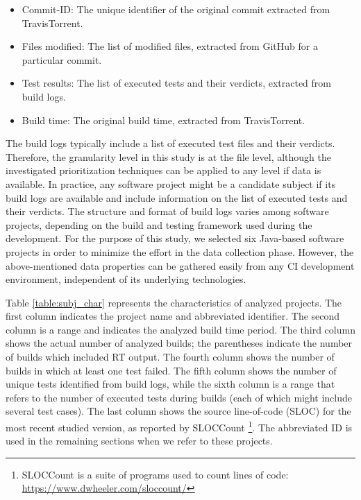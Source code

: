\documentclass[1p]{elsarticle}
\begin{document}
\begin{itemize}
\item Commit-ID: The unique identifier of the original commit extracted from TravisTorrent. 
\item Files modified: The list of modified files, extracted from GitHub for a particular commit. 
\item Test results: The list of executed tests and their verdicts, extracted from build logs. 
\item Build time: The original build time, extracted from TravisTorrent. 
\end{itemize}

The build logs typically include a list of executed test files and their verdicts. Therefore, the granularity level in this study is at the file level, although the investigated prioritization techniques can be applied to any level if data is available. In practice, any software project might be a candidate subject if its build logs are available and include information on the list of executed tests and their verdicts. The structure and format of build logs varies among software projects, depending on the build and testing framework used during the development. For the purpose of this study, we selected six Java-based software projects in order to minimize the effort in the data collection phase. However, the above-mentioned data properties can be gathered easily from any CI development environment, independent of its underlying technologies. 

Table \ref{table:subj_char} represents the characteristics of analyzed projects. The first column indicates the project name and abbreviated identifier. The second column is a range and indicates the analyzed build time period. The third column shows the actual number of analyzed builds; the parentheses indicate the number of builds which included RT output. The fourth column shows the number of builds in which at least one test failed. The fifth column shows the number of unique tests identified from build logs, while the sixth column is a range that refers to the number of executed tests during builds (each of which might include several test cases). The last column shows the source line-of-code (SLOC) for the most recent studied version, as reported by SLOCCount \footnote{SLOCCount is a suite of programs used to count lines of code: \url{https://www.dwheeler.com/sloccount/}}. The abbreviated ID is used in the remaining sections when we refer to these projects.
\end{document}
